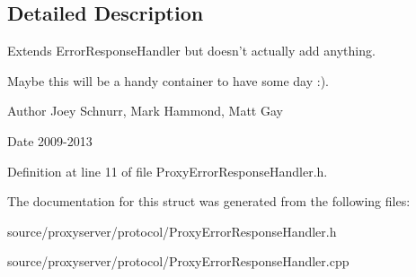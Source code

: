 \subsection{Detailed Description}
Extends Error\-Response\-Handler but doesn't actually add anything. 

Maybe this will be a handy container to have some day \-:). \begin{DoxyAuthor}{Author}
Joey Schnurr, Mark Hammond, Matt Gay 
\end{DoxyAuthor}
\begin{DoxyDate}{Date}
2009-\/2013 
\end{DoxyDate}


Definition at line 11 of file Proxy\-Error\-Response\-Handler.\-h.



The documentation for this struct was generated from the following files\-:\begin{DoxyCompactItemize}
\item 
source/proxyserver/protocol/Proxy\-Error\-Response\-Handler.\-h\item 
source/proxyserver/protocol/Proxy\-Error\-Response\-Handler.\-cpp\end{DoxyCompactItemize}
